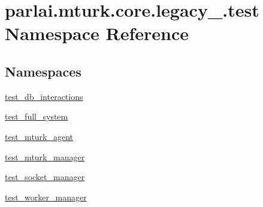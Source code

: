 \hypertarget{namespaceparlai_1_1mturk_1_1core_1_1legacy__2018_1_1test}{}\section{parlai.\+mturk.\+core.\+legacy\+\_.\+test Namespace Reference}
\label{namespaceparlai_1_1mturk_1_1core_1_1legacy__2018_1_1test}
\subsection*{Namespaces}
\begin{DoxyCompactItemize}
\item 
 \hyperlink{namespaceparlai_1_1mturk_1_1core_1_1legacy__2018_1_1test_1_1test__db__interactions}{test\+\_\+db\+\_\+interactions}
\item 
 \hyperlink{namespaceparlai_1_1mturk_1_1core_1_1legacy__2018_1_1test_1_1test__full__system}{test\+\_\+full\+\_\+system}
\item 
 \hyperlink{namespaceparlai_1_1mturk_1_1core_1_1legacy__2018_1_1test_1_1test__mturk__agent}{test\+\_\+mturk\+\_\+agent}
\item 
 \hyperlink{namespaceparlai_1_1mturk_1_1core_1_1legacy__2018_1_1test_1_1test__mturk__manager}{test\+\_\+mturk\+\_\+manager}
\item 
 \hyperlink{namespaceparlai_1_1mturk_1_1core_1_1legacy__2018_1_1test_1_1test__socket__manager}{test\+\_\+socket\+\_\+manager}
\item 
 \hyperlink{namespaceparlai_1_1mturk_1_1core_1_1legacy__2018_1_1test_1_1test__worker__manager}{test\+\_\+worker\+\_\+manager}
\end{DoxyCompactItemize}
